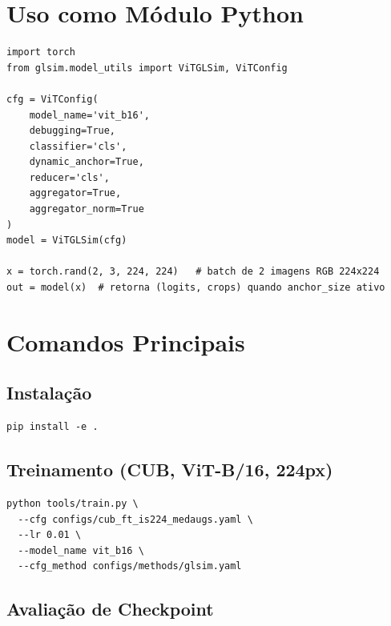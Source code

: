 \documentclass[a4paper,12pt]{scrartcl}
\begin{document}
\section{Uso como M\'odulo Python}

\begin{lstlisting}[style=pythonstyle,
  caption={Exemplo de uso do \texttt{ViTGLSim} como m\'odulo Python}]
import torch
from glsim.model_utils import ViTGLSim, ViTConfig

cfg = ViTConfig(
    model_name='vit_b16',
    debugging=True,
    classifier='cls',
    dynamic_anchor=True,
    reducer='cls',
    aggregator=True,
    aggregator_norm=True
)
model = ViTGLSim(cfg)

x = torch.rand(2, 3, 224, 224)   # batch de 2 imagens RGB 224x224
out = model(x)  # retorna (logits, crops) quando anchor_size ativo
\end{lstlisting}

\section{Comandos Principais}

\subsection{Instala\c{c}\~ao}

\begin{lstlisting}[style=bashstyle, caption={Instala\c{c}\~ao do pacote}]
pip install -e .
\end{lstlisting}

\subsection{Treinamento (CUB, ViT-B/16, 224px)}

\begin{lstlisting}[style=bashstyle,
  caption={Treinamento no dataset CUB-200-2011 com ViT-B/16}]
python tools/train.py \
  --cfg configs/cub_ft_is224_medaugs.yaml \
  --lr 0.01 \
  --model_name vit_b16 \
  --cfg_method configs/methods/glsim.yaml
\end{lstlisting}

\subsection{Avalia\c{c}\~ao de Checkpoint}
\end{document}
